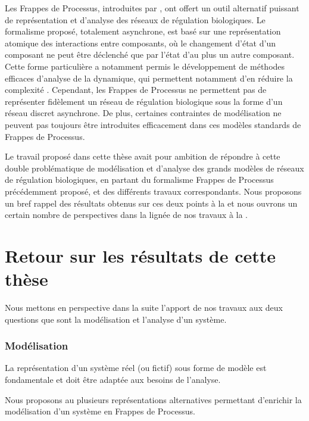 Les Frappes de Processus, introduites par ,
ont offert un outil alternatif puissant de représentation et d'analyse des
réseaux de régulation biologiques.
Le formalisme proposé, totalement asynchrone, est basé sur une représentation
atomique des interactions entre composants,
où le changement d'état d'un composant ne peut être déclenché que par l'état d'au plus
un autre composant.
Cette forme particulière a notamment permis le développement de méthodes efficaces
d'analyse de la dynamique, qui permettent notamment d'en réduire la complexité \cite{PMR12-MSCS}.
Cependant, les Frappes de Processus ne permettent pas de représenter fidèlement
un réseau de régulation biologique sous la forme d'un réseau discret asynchrone.
De plus, certaines contraintes de modélisation ne peuvent pas toujours être introduites
efficacement dans ces modèles standards de Frappes de Processus.

Le travail proposé dans cette thèse avait pour ambition de répondre à cette double problématique
de modélisation et d'analyse des grands modèles de réseaux de régulation biologiques,
en partant du formalisme Frappes de Processus précédemment proposé,
et des différents travaux correspondants.
Nous proposons un bref rappel des résultats obtenus sur ces deux points à la 
et nous ouvrons un certain nombre de perspectives dans la lignée de nos travaux
à la .



\section{Retour sur les résultats de cette thèse}

Nous mettons en perspective dans la suite l'apport de nos travaux aux deux questions
que sont la modélisation et l'analyse d'un système.

\subsubsection*{Modélisation}

La représentation d'un système réel (ou fictif) sous forme de modèle est fondamentale
et doit être adaptée aux besoins de l'analyse.

\myskip

Nous proposons au  plusieurs représentations alternatives
permettant d'enrichir la modélisation d'un système en Frappes de Processus.

